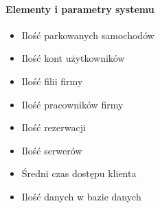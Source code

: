 \documentclass[paper=a4, fontsize=11pt]{scrartcl} %
\begin{document}
\paragraph{Elementy i parametry systemu}

\begin{itemize}
  \item Ilość parkowanych samochodów
  \item Ilość kont użytkowników
  \item Ilość filii firmy
  \item Ilość pracowników firmy
  \item Ilość rezerwacji
  \item Ilość serwerów
  \item Średni czas dostępu klienta 
  \item Ilość danych w bazie danych
\end{itemize}
\end{document}
